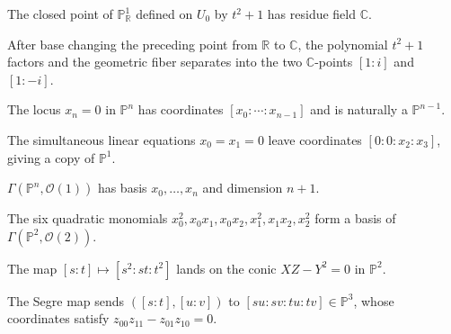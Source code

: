 \begin{example}\label{ex:vi36-09}
The closed point of \(\mathbb P^1_{\mathbb R}\) defined on \(U_0\) by \(t^2+1\) has residue field \(\mathbb C\).
\end{example}

\begin{example}\label{ex:vi36-10}
After base changing the preceding point from \(\mathbb R\) to \(\mathbb C\), the polynomial \(t^2+1\) factors and the geometric fiber separates into the two \(\mathbb C\)-points \([1:i]\) and \([1:-i]\).
\end{example}

\begin{example}[A hyperplane]\label{ex:vi36-11}
The locus \(x_n=0\) in \(\mathbb P^n\) has coordinates \([x_0:\cdots:x_{n-1}]\) and is naturally a \(\mathbb P^{n-1}\).
\end{example}

\begin{example}\label{ex:vi36-12}
The simultaneous linear equations \(x_0=x_1=0\) leave coordinates \([0:0:x_2:x_3]\), giving a copy of \(\mathbb P^1\).
\end{example}

\begin{example}\label{ex:vi36-13}
\(\Gamma(\mathbb P^n,\mathcal O(1))\) has basis \(x_0,\ldots,x_n\) and dimension \(n+1\).
\end{example}

\begin{example}\label{ex:vi36-14}
The six quadratic monomials \(x_0^2,x_0x_1,x_0x_2,x_1^2,x_1x_2,x_2^2\) form a basis of \(\Gamma(\mathbb P^2,\mathcal O(2))\).
\end{example}

\begin{example}\label{ex:vi36-15}
The map \([s:t]\mapsto[s^2:st:t^2]\) lands on the conic \(XZ-Y^2=0\) in \(\mathbb P^2\).
\end{example}

\begin{example}\label{ex:vi36-16}
The Segre map sends \(([s:t],[u:v])\) to \([su:sv:tu:tv]\in\mathbb P^3\), whose coordinates satisfy \(z_{00}z_{11}-z_{01}z_{10}=0\).
\end{example}
